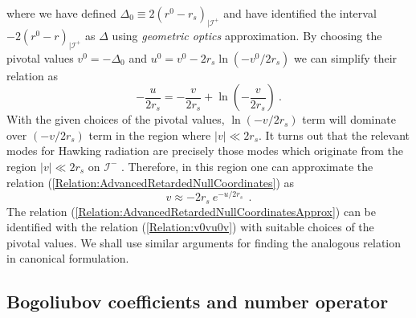 \documentclass[aps,12pt,showpacs]{revtex4-2}
\def\rs{r_s}
\def\scriplus{\mathscr{I}^{+}}
\def\scriminus{\mathscr{I}^{-}}
\begin{document}
%
where we have defined $\Delta_0 \equiv 2(r^0 - \rs)_{|\scriplus}$ and have
identified the interval $-2(r^0 -r)_{|\scriplus}$ as $\Delta$ using 
\emph{geometric optics} approximation. By choosing the pivotal values  $v^0 = 
-\Delta_0$ and $u^0 = v^0 - 2\rs \ln (-v^0/2\rs)$ we can simplify their relation 
as 
%
\begin{equation}\label{Relation:AdvancedRetardedNullCoordinates}
- \frac{u}{2\rs} = - \frac{v}{2 \rs}  +  \ln \left(-\frac{v}{2 \rs}\right)  ~.
\end{equation}
%
With the given choices of the pivotal values, $\ln(-v/2\rs)$ term will dominate 
over $(-v/2\rs)$ term in the region where $|v| \ll 2\rs$. It turns out that the 
relevant modes for Hawking radiation are precisely those modes which originate 
from the region $|v| \ll 2\rs$ on $\scriminus$ . Therefore, in this region 
one can approximate the relation 
(\ref{Relation:AdvancedRetardedNullCoordinates}) as
%
\begin{equation}\label{Relation:AdvancedRetardedNullCoordinatesApprox}
v \approx -2\rs~ e^{-u/2 \rs} ~~.
\end{equation}
%
The relation (\ref{Relation:AdvancedRetardedNullCoordinatesApprox}) can be 
identified with the relation (\ref{Relation:v0vu0v}) with suitable choices of 
the pivotal values.  We shall use similar arguments for finding the analogous 
relation in canonical formulation.




\subsection{Bogoliubov coefficients and number operator}
\end{document}
